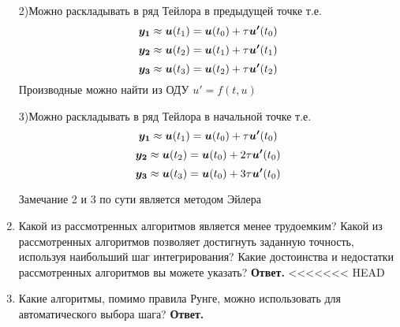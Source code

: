 \documentclass{article}
\renewcommand{\vec}[1]{\text{\mathversion{bold}${#1}$}}%
\begin{document}
\begin{enumerate}
	
	2)Можно раскладывать в ряд Тейлора в предыдущей точке т.е. 
	\[
	\vec{y_1} \approx \vec{u}(t_1) = \vec{u}(t_0) + \tau \vec{u'}(t_0)
	\]
	\[
	\vec{y_2} \approx \vec{u}(t_2) = \vec{u}(t_1) + \tau \vec{u'}(t_1)
	\]
	\[
	\vec{y_3} \approx \vec{u}(t_3) = \vec{u}(t_2) + \tau \vec{u'}(t_2)
	\]
	Производные можно найти из ОДУ $u'=f(t,u)$
	
	3)Можно раскладывать в ряд Тейлора в начальной точке т.е. 
	\[
	\vec{y_1} \approx \vec{u}(t_1) = \vec{u}(t_0) + \tau \vec{u'}(t_0)
	\]
	\[
	\vec{y_2} \approx \vec{u}(t_2) = \vec{u}(t_0) + 2\tau \vec{u'}(t_0)
	\]
	\[
	\vec{y_3} \approx \vec{u}(t_3) = \vec{u}(t_0) + 3\tau \vec{u'}(t_0)
	\]
	
	
	Замечание 2 и 3 по сути является методом Эйлера
        \item Какой из рассмотренных алгоритмов является менее трудоемким? Какой из рассмотренных алгоритмов позволяет достигнуть заданную точность, используя наибольший
        шаг интегрирования? Какие достоинства и недостатки рассмотренных алгоритмов вы можете указать?
        \newline
        {\bfseries Ответ. } 
<<<<<<< HEAD
        \item Какие алгоритмы, помимо правила Рунге, можно использовать для автоматического выбора шага?
        \newline
        {\bfseries Ответ. } 
        
    \end{enumerate}
\end{document}
